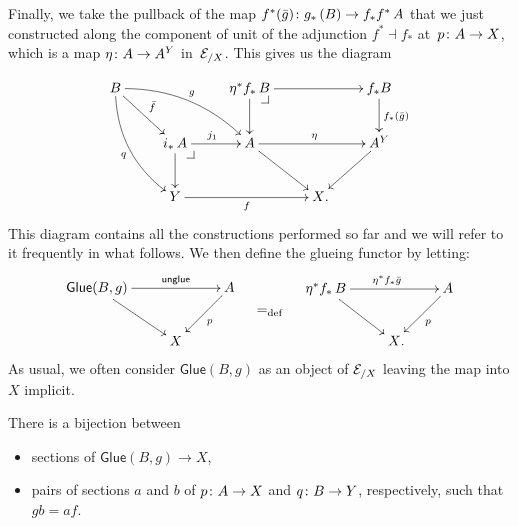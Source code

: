 \documentclass[reqno,a4paper,oneside]{amsart}
\begin{document}
\smallskip



Finally, we take the pullback of the map $f^*(\bar{g}) \co  g_* \, (B)  \to f_* f^* \, A $ that we just constructed along the component of unit of the adjunction
$f^* \dashv f_*$ at~$p \co A \to X$, which is a map $\eta \co A \to A^Y$ in~$\cal{E}_{/X}$. This gives us the diagram 

\begin{equation}
\label{equ:total-diagram}
\begin{gathered}
\xymatrix{
 B \ar[dr]^{\bar{f}} \ar@/_1pc/[ddr]_{q} \ar@/^1pc/[drr]^g &         &       \eta^* f_* \, B \drpullback                \ar[d] \ar[rr]  & & f_* B \ar[d]^{f_{*}(\bar{g})}  \\ 
      &             i_* \, A \ar[r]^{j_1}  \ar[d]  \drpullback &        A                \ar[dr]   \ar[rr]^\eta              &  & A^Y \ar[dl] \\
      &                       Y \ar[rr]_f                &  			          & X	 \rlap{.} & }
\end{gathered}
\end{equation}
This diagram contains all the constructions performed so far and we will refer to it frequently in what follows.  We then define the glueing functor by letting: 
\[
\begin{gathered}
\xymatrix{
\mathsf{Glue}(B,g) \ar[rr]^-{\mathsf{unglue}} \ar[dr]  & & A \ar[dl]^{p}   \\
 & X & }
 \end{gathered} \quad \defeq \quad
 \begin{gathered}
 \xymatrix{
  \eta^* f_* \, B \ar[rr]^{\eta^* f_{*} \bar{g}} \ar[dr] & & A \ar[dl]^{p} \\
   & X \rlap{.} & }
   \end{gathered}
 \]
 As usual, we often consider $\mathsf{Glue}(B,g)$ as an object of $\cal{E}_{/X}$ leaving the map into $X$  implicit. 
 
 
 \medskip


\begin{proposition} \label{thm:glueing-classifies-sections} There is a bijection between 
\begin{itemize}
\item sections of $\mathsf{Glue}(B, g) \to X$,
\item pairs of sections $a$ and $b$ of $p \co A \to X$ and $q \co B \to Y$, respectively, such that 
$g b = a f$.
\end{itemize}
\end{proposition} 
\end{document}

